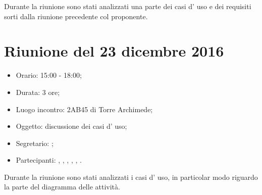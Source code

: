 Durante la riunione sono stati analizzati una parte dei casi d' uso e dei requisiti sorti dalla riunione precedente col proponente.


\section{Riunione del 23 dicembre 2016}

\begin{itemize}
	\item Orario: 15:00 - 18:00;
	\item Durata: 3 ore;
	\item Luogo incontro: 2AB45 di Torre Archimede; 
	\item Oggetto: discussione dei casi d' uso;
	\item Segretario: \PB; 
	\item Partecipanti: \AZ, \GG, \LB, \LS, \MM, \PB.
\end{itemize}

Durante la riunione sono stati analizzati i casi d' uso, in particolar modo riguardo la parte del diagramma delle attività.

